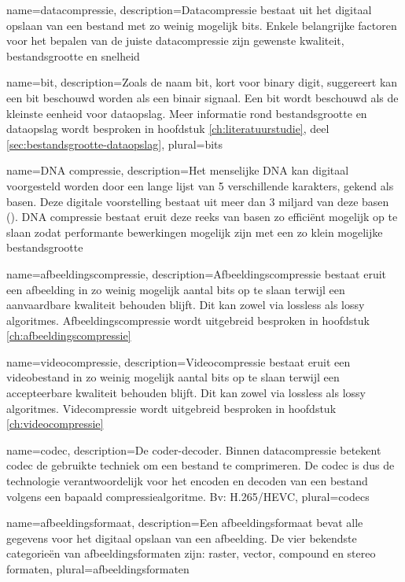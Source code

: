 {
	name={datacompressie},
	description={Datacompressie bestaat uit het digitaal opslaan van een bestand met zo weinig mogelijk bits. Enkele belangrijke factoren voor het bepalen van de juiste datacompressie zijn gewenste kwaliteit, bestandsgrootte en snelheid}
}

{
	name={bit},
	description={Zoals de naam bit, kort voor binary digit, suggereert kan een bit beschouwd worden als een binair signaal. Een bit wordt beschouwd als de kleinste eenheid voor dataopslag. Meer informatie rond bestandsgrootte en dataopslag wordt besproken in hoofdstuk \ref{ch:literatuurstudie}, deel \ref{sec:bestandsgrootte-dataopslag}},
	plural={bits}
}

{
	name={DNA compressie},
	description={Het menselijke DNA kan digitaal voorgesteld worden door een lange lijst van 5 verschillende karakters, gekend als basen. Deze digitale voorstelling bestaat uit meer dan 3 miljard van deze basen (\cite{dodanaugent2011}). DNA compressie bestaat eruit deze reeks van basen zo efficiënt mogelijk op te slaan zodat performante bewerkingen mogelijk zijn met een zo klein mogelijke bestandsgrootte}
}

{
	name={afbeeldingscompressie},
	description={Afbeeldingscompressie bestaat eruit een afbeelding in zo weinig mogelijk aantal bits op te slaan terwijl een aanvaardbare kwaliteit behouden blijft. Dit kan zowel via lossless als lossy algoritmes. Afbeeldingscompressie wordt uitgebreid besproken in hoofdstuk \ref{ch:afbeeldingscompressie}}
}

{
	name={videocompressie},
	description={Videocompressie bestaat eruit een videobestand in zo weinig mogelijk aantal bits op te slaan terwijl een accepteerbare kwaliteit behouden blijft. Dit kan zowel via lossless als lossy algoritmes. Videcompressie wordt uitgebreid besproken in hoofdstuk \ref{ch:videocompressie}}
}

{
	name={codec},
	description={De coder-decoder. Binnen datacompressie betekent codec de gebruikte techniek om een bestand te comprimeren. De codec is dus de technologie verantwoordelijk voor het encoden en decoden van een bestand volgens een bapaald compressiealgoritme. Bv: H.265/HEVC},
	plural={codecs}
}

{
	name={afbeeldingsformaat},
	description={Een afbeeldingsformaat bevat alle gegevens voor het digitaal opslaan van een afbeelding. De vier bekendste categorieën van afbeeldingsformaten zijn: raster, vector, compound en stereo formaten},
	plural={afbeeldingsformaten}
}

